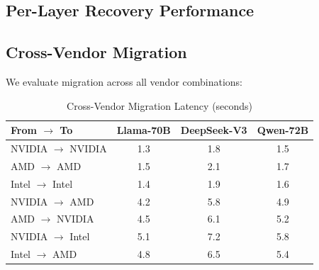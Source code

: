 \documentclass[conference,10pt,letterpaper]{IEEEtran}
\begin{document}
\subsection{Per-Layer Recovery Performance}

\begin{table}[!t]
\caption{Per-Layer MTTR Comparison (seconds)}
\label{tab:perlayer}
\centering\scriptsize
{}
\end{table}

\subsection{Cross-Vendor Migration}

We evaluate migration across all vendor combinations:

\begin{table}[!t]
\caption{Cross-Vendor Migration Latency (seconds)}
\label{tab:crossvendor}
\centering\scriptsize
\begin{tabular}{@{}lccc@{}}
\toprule
\textbf{From $\to$ To} & \textbf{Llama-70B} & \textbf{DeepSeek-V3} & \textbf{Qwen-72B} \\
\midrule
NVIDIA $\to$ NVIDIA & 1.3 & 1.8 & 1.5 \\
AMD $\to$ AMD & 1.5 & 2.1 & 1.7 \\
Intel $\to$ Intel & 1.4 & 1.9 & 1.6 \\
NVIDIA $\to$ AMD & 4.2 & 5.8 & 4.9 \\
AMD $\to$ NVIDIA & 4.5 & 6.1 & 5.2 \\
NVIDIA $\to$ Intel & 5.1 & 7.2 & 5.8 \\
Intel $\to$ AMD & 4.8 & 6.5 & 5.4 \\
\bottomrule
\end{tabular}
\end{table}
\end{document}
